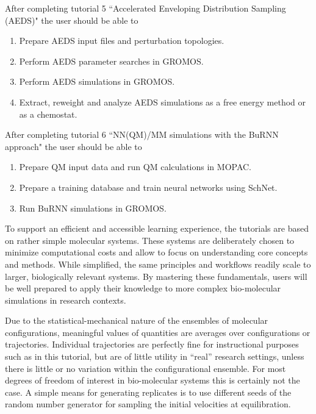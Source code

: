 %
After completing tutorial 5 ``Accelerated Enveloping Distribution Sampling (AEDS)" the user should be able to
\begin{enumerate}
\item Prepare AEDS input files and perturbation topologies.
\item Perform AEDS parameter searches in GROMOS.
\item Perform AEDS simulations in GROMOS.
\item Extract, reweight and analyze AEDS simulations as a free energy method or as a chemostat.
\end{enumerate}
%
After completing tutorial 6 “NN(QM)/MM simulations with the BuRNN approach" the user should be able to
\begin{enumerate}
\item Prepare QM input data and run QM calculations in MOPAC.
\item Prepare a training database and train neural networks using SchNet.
\item Run BuRNN simulations in GROMOS.
\end{enumerate}
%

To support an efficient and accessible learning experience, the tutorials are based on rather simple molecular systems. These systems are deliberately chosen to minimize computational costs and allow to focus on understanding core concepts and methods. While simplified, the same principles and workflows readily scale to larger, biologically relevant systems. By mastering these fundamentals, users will be well prepared to apply their knowledge to more complex bio-molecular simulations in research contexts.

Due to the statistical-mechanical nature of the ensembles of molecular configurations, meaningful values of quantities are averages over configurations or trajectories. Individual trajectories are perfectly fine for instructional purposes such as in this tutorial, but are of little utility in ``real'' research settings, unless there is little or no variation within the configurational ensemble. 
For most degrees of freedom of interest in bio-molecular systems this is certainly not the case. A simple means for generating replicates is to use different seeds of the random number generator for sampling the initial velocities at equilibration. 



